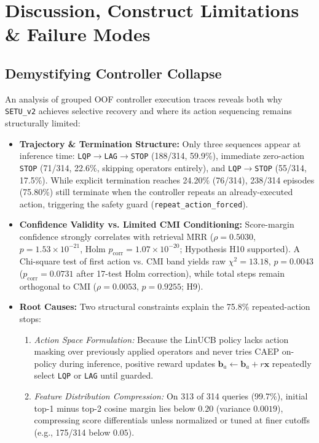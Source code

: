 \documentclass[conference]{IEEEtran}
\begin{document}
\section{Discussion, Construct Limitations \& Failure Modes}
\label{sec:discussion}

\subsection{Demystifying Controller Collapse}
An analysis of grouped OOF controller execution traces reveals both why \texttt{SETU\_v2} achieves selective recovery and where its action sequencing remains structurally limited:
\begin{itemize}
    \item \textbf{Trajectory & Termination Structure:} Only three sequences appear at inference time: \texttt{LQP$\to$LAG$\to$STOP} (188/314, 59.9\%), immediate zero-action \texttt{STOP} (71/314, 22.6\%, skipping operators entirely), and \texttt{LQP$\to$STOP} (55/314, 17.5\%). While explicit termination reaches 24.20\% (76/314), 238/314 episodes (75.80\%) still terminate when the controller repeats an already-executed action, triggering the safety guard (\texttt{repeat\_action\_forced}).
    \item \textbf{Confidence Validity vs. Limited CMI Conditioning:} Score-margin confidence strongly correlates with retrieval MRR ($\rho = 0.5030$, $p = 1.53 \times 10^{-21}$, Holm $p_{\text{corr}} = 1.07 \times 10^{-20}$; Hypothesis H10 supported). A Chi-square test of first action vs. CMI band yields raw $\chi^2 = 13.18$, $p = 0.0043$ ($p_{\text{corr}} = 0.0731$ after 17-test Holm correction), while total steps remain orthogonal to CMI ($\rho = 0.0053$, $p = 0.9255$; H9).
    \item \textbf{Root Causes:} Two structural constraints explain the 75.8\% repeated-action stops:
    \begin{enumerate}
        \item \textit{Action Space Formulation:} Because the LinUCB policy lacks action masking over previously applied operators and never tries CAEP on-policy during inference, positive reward updates $\mathbf{b}_a \leftarrow \mathbf{b}_a + r\mathbf{x}$ repeatedly select \texttt{LQP} or \texttt{LAG} until guarded.
        \item \textit{Feature Distribution Compression:} On 313 of 314 queries (99.7\%), initial top-1 minus top-2 cosine margin lies below $0.20$ (variance $0.0019$), compressing score differentials unless normalized or tuned at finer cutoffs (e.g., 175/314 below $0.05$).
    \end{enumerate}
\end{itemize}
\end{document}
